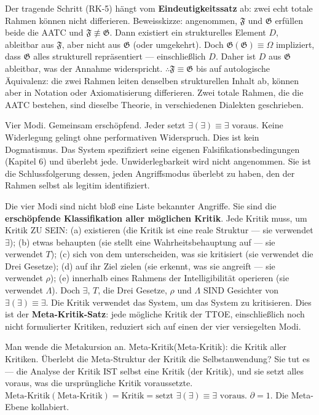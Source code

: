 \documentclass[10pt, openany, oneside]{book}
\begin{document}
Der tragende Schritt (RK-5) hängt vom \textbf{Eindeutigkeitssatz} ab: zwei echt totale Rahmen können nicht differieren. Beweisskizze: angenommen, $\mathfrak{F}$ und $\mathfrak{G}$ erfüllen beide die AATC und $\mathfrak{F} \not\equiv \mathfrak{G}$. Dann existiert ein strukturelles Element $D$, ableitbar aus $\mathfrak{F}$, aber nicht aus $\mathfrak{G}$ (oder umgekehrt). Doch $\mathfrak{G}(\mathfrak{G}) \equiv \Omega$ impliziert, dass $\mathfrak{G}$ alles strukturell repräsentiert --- einschließlich $D$. Daher ist $D$ aus $\mathfrak{G}$ ableitbar, was der Annahme widerspricht. $\therefore \mathfrak{F} \equiv \mathfrak{G}$ bis auf autologische Äquivalenz: die zwei Rahmen leiten denselben strukturellen Inhalt ab, können aber in Notation oder Axiomatisierung differieren. Zwei totale Rahmen, die die AATC bestehen, sind dieselbe Theorie, in verschiedenen Dialekten geschrieben.

Vier Modi. Gemeinsam erschöpfend. Jeder setzt $\exists(\exists) \equiv \exists$ voraus. Keine Widerlegung gelingt ohne performativen Widerspruch. Dies ist kein Dogmatismus. Das System spezifiziert seine eigenen Falsifikationsbedingungen (Kapitel 6) und überlebt jede. Unwiderlegbarkeit wird nicht angenommen. Sie ist die Schlussfolgerung dessen, jeden Angriffsmodus überlebt zu haben, den der Rahmen selbst als legitim identifiziert.

Die vier Modi sind nicht bloß eine Liste bekannter Angriffe. Sie sind die \textbf{erschöpfende Klassifikation aller möglichen Kritik}. Jede Kritik muss, um Kritik ZU SEIN: (a) existieren (die Kritik ist eine reale Struktur --- sie verwendet $\exists$); (b) etwas behaupten (sie stellt eine Wahrheitsbehauptung auf --- sie verwendet $T$); (c) sich von dem unterscheiden, was sie kritisiert (sie verwendet die Drei Gesetze); (d) auf ihr Ziel zielen (sie erkennt, was sie angreift --- sie verwendet $\rho$); (e) innerhalb eines Rahmens der Intelligibilität operieren (sie verwendet $\Lambda$). Doch $\exists$, $T$, die Drei Gesetze, $\rho$ und $\Lambda$ SIND Gesichter von $\exists(\exists) \equiv \exists$. Die Kritik verwendet das System, um das System zu kritisieren. Dies ist der \textbf{Meta-Kritik-Satz}: jede mögliche Kritik der TTOE, einschließlich noch nicht formulierter Kritiken, reduziert sich auf einen der vier versiegelten Modi.

Man wende die Metakursion an. Meta-Kritik(Meta-Kritik): die Kritik aller Kritiken. Überlebt die Meta-Struktur der Kritik die Selbstanwendung? Sie tut es --- die Analyse der Kritik IST selbst eine Kritik (der Kritik), und sie setzt alles voraus, was die ursprüngliche Kritik voraussetzte. $\text{Meta-Kritik}(\text{Meta-Kritik}) = \text{Kritik} = \text{setzt } \exists(\exists) \equiv \exists \text{ voraus}$. $\partial = 1$. Die Meta-Ebene kollabiert.
\end{document}
